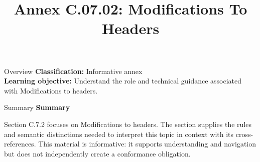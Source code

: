 \documentclass[10pt,letterpaper]{article}
\title{Annex C.07.02: Modifications To Headers}
\author{}
\date{}
\begin{document}
\maketitle
\begin{CornellOverviewBox}{Overview}
\textbf{Classification:} Informative annex\\[2pt]
\textbf{Learning objective:} Understand the role and technical guidance associated with Modifications to headers.
\end{CornellOverviewBox}\begin{CornellSummaryBox}{Summary}
{\sffamily\bfseries\color{Accent} Summary}\par\vspace{3pt}Section C.7.2 focuses on Modifications to headers. The section supplies the rules and semantic distinctions needed to interpret this topic in context with its cross-references. This material is informative: it supports understanding and navigation but does not independently create a conformance obligation.
\end{CornellSummaryBox}
\end{document}
